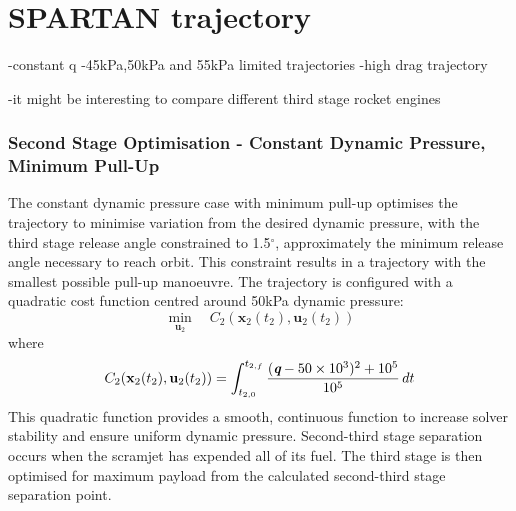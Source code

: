 \section{SPARTAN trajectory}
-constant q
-45kPa,50kPa and 55kPa limited trajectories
-high drag trajectory

-it might be interesting to compare different third stage rocket engines 



\subsubsection{Second Stage Optimisation - Constant Dynamic Pressure, Minimum Pull-Up}


The constant dynamic pressure case with minimum pull-up optimises the trajectory to minimise variation from the desired dynamic pressure, with the third stage release angle constrained to 1.5$^\circ$, approximately the minimum release angle necessary to reach orbit. This constraint results in a trajectory with the smallest possible pull-up manoeuvre. 
The trajectory is configured with a quadratic cost function centred around 50kPa dynamic pressure:
\begin{equation} 
\min\limits_{\textbf{u}_2} \quad C_2(\textbf{x}_{2}(t_2),\textbf{u}_{2}(t_2))
\end{equation}
where
\begin{equation}
C_2(\textbf{x}_{2}(t_2),\textbf{u}_{2}(t_2)) = \int_{t_{2,0}}^{t_{2,f}} \frac{(\textit{\textbf{q}}-50\times 10^3)^2+10^5}{10^5} \, dt
\end{equation}
This quadratic function provides a smooth, continuous function to increase solver stability and ensure uniform dynamic pressure. Second-third stage separation occurs when the scramjet has expended all of its fuel.  The third stage is then optimised for maximum payload from the calculated second-third stage separation point. 

